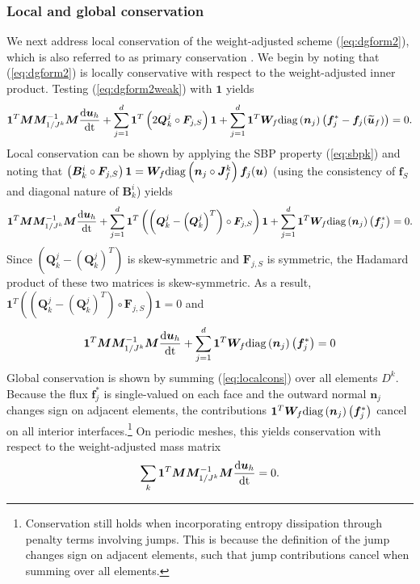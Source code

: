 \documentclass[preprint,10pt]{article}
\theoremstyle{definition}
\theoremstyle{lemma}
\theoremstyle{theorem}
\theoremstyle{assumption}
\renewcommand{\tilde}{\widetilde}
\newcommand{\td}[2]{\frac{{\rm d}#1}{{\rm d}{\rm #2}}}
\newcommand{\LRp}[1]{\left( #1 \right)}
\newcommand{\diag}[1]{{\rm diag}\LRp{#1}}
\begin{document}
{\subsubsection{Local and global conservation}
\label{sec:conservation}
We next address local conservation of the weight-adjusted scheme (\ref{eq:dgform2}), which is also referred to as primary conservation \cite{fisher2013discretely, fisher2013high, carpenter2014entropy, friedrich2017entropy}.  We begin by noting that (\ref{eq:dgform2}) is locally conservative with respect to the weight-adjusted inner product.  Testing (\ref{eq:dgform2weak}) with $\bm{1}$ yields
\[
\bm{1}^T\bm{M}\bm{M}_{1/J^k}^{-1}\bm{M}\td{\bm{u}_h}{t} + 
\sum_{j=1}^d \bm{1}^T \LRp{2\bm{Q}^j_k \circ \bm{F}_{j,S}}\bm{1} + \sum_{j=1}^d \bm{1}^T\bm{W}_f \diag{\bm{n}_j}\LRp{\bm{f}_j^* - \bm{f}_j(\tilde{\bm{u}}_f)} = 0.
\]
Local conservation can be shown by applying the SBP property (\ref{eq:sbpk}) and noting that $\LRp{\bm{B}^i_k \circ \bm{F}_{j,S}}\bm{1} = \bm{W}_f\diag{\bm{n}_j \circ \bm{J}^k_f}\bm{f}_j(\bm{u})$ (using the consistency of $\bm{f}_S$ and diagonal nature of $\bm{B}^i_k$) yields
\[
\bm{1}^T\bm{M}\bm{M}_{1/J^k}^{-1}\bm{M}\td{\bm{u}_h}{t} + 
\sum_{j=1}^d \bm{1}^T \LRp{\LRp{\bm{Q}^j_k-\LRp{\bm{Q}^j_k}^T} \circ \bm{F}_{j,S}}\bm{1} + \sum_{j=1}^d \bm{1}^T\bm{W}_f \diag{\bm{n}_j}\LRp{\bm{f}_j^*} = 0.
\]
Since $\LRp{\bm{Q}^j_k-\LRp{\bm{Q}^j_k}^T} $ is skew-symmetric and $\bm{F}_{j,S}$ is symmetric, the Hadamard product of these two matrices is skew-symmetric.  As a result, $\bm{1}^T \LRp{\LRp{\bm{Q}^j_k-\LRp{\bm{Q}^j_k}^T} \circ \bm{F}_{j,S}}\bm{1} = 0$ and 
\begin{equation}
\bm{1}^T\bm{M}\bm{M}_{1/J^k}^{-1}\bm{M}\td{\bm{u}_h}{t} + \sum_{j=1}^d \bm{1}^T\bm{W}_f \diag{\bm{n}_j}\LRp{\bm{f}_j^*} = 0
\label{eq:localcons}
\end{equation}
Global conservation is shown by summing (\ref{eq:localcons}) over all elements $D^k$.  Because the flux $\bm{f}_j^*$ is single-valued on each face and the outward normal $\bm{n}_j$ changes sign on adjacent elements, the contributions $\bm{1}^T\bm{W}_f \diag{\bm{n}_j}\LRp{\bm{f}_j^*}$ cancel on all interior interfaces.\footnote{Conservation still holds when incorporating entropy dissipation through penalty terms involving jumps.  This is because the definition of the jump changes sign on adjacent elements, such that jump contributions cancel when summing over all elements.} On periodic meshes, this yields conservation with respect to the weight-adjusted mass matrix
\[
\sum_k \bm{1}^T\bm{M}\bm{M}_{1/J^k}^{-1}\bm{M}\td{\bm{u}_h}{t} = 0.
\]}
\end{document}
